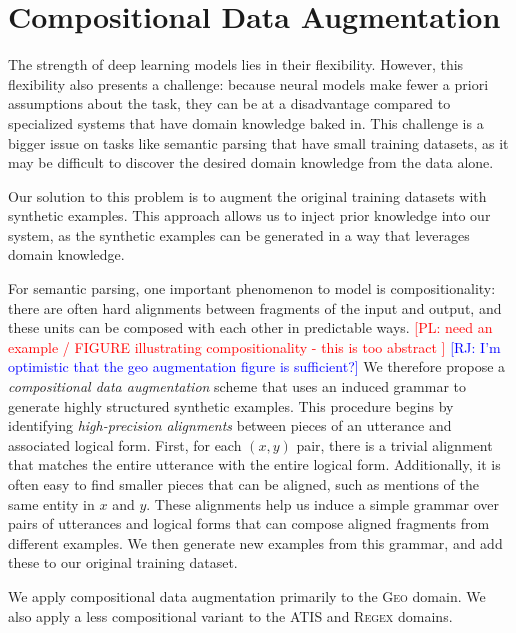 \documentclass[11pt,letterpaper]{article}
\newcommand{\atis}{\textsc{ATIS}\xspace}
\newcommand{\regex}{\textsc{Regex}\xspace}
\newcommand{\geo}{\textsc{Geo}\xspace}
\newcommand\pl[1]{\textcolor{red}{[PL: #1]}}
\newcommand\rj[1]{\textcolor{blue}{[RJ: #1]}}
\begin{document}
\section{Compositional Data Augmentation}
The strength of deep learning models lies in their flexibility.
However, this flexibility also presents a challenge:
because neural models make fewer a priori assumptions about the task,
they can be at a disadvantage compared to specialized systems
that have domain knowledge baked in.
This challenge is a bigger issue on tasks like semantic parsing
that have small training datasets, as
it may be difficult to discover the desired domain knowledge
from the data alone.

Our solution to this problem is to
augment the original training datasets with synthetic examples.
This approach allows us to inject prior knowledge into our system,
as the synthetic examples can be generated 
in a way that leverages domain knowledge.

For semantic parsing, one important phenomenon to model is compositionality:
there are often hard alignments between fragments
of the input and output, and these units can be composed
with each other in predictable ways.
\pl{need an example / FIGURE illustrating compositionality - this is too abstract }
\rj{I'm optimistic that the geo augmentation figure is sufficient?}
We therefore propose a \emph{compositional data augmentation} scheme
that uses an induced grammar to generate highly structured synthetic examples.
This procedure begins by identifying \emph{high-precision alignments}
between pieces of an utterance and associated logical form.
First, for each $(x, y)$ pair, there is a trivial alignment that
matches the entire utterance with the entire logical form.
Additionally, it is often easy to find smaller pieces that can be aligned,
such as mentions of the same entity in $x$ and $y$.
These alignments help us
induce a simple grammar over pairs of utterances and logical forms
that can compose aligned fragments from different examples.
We then generate new examples from this grammar,
and add these to our original training dataset.

We apply compositional data augmentation primarily to the \geo domain.
We also apply a less compositional variant to the
\atis and \regex domains.
\end{document}
